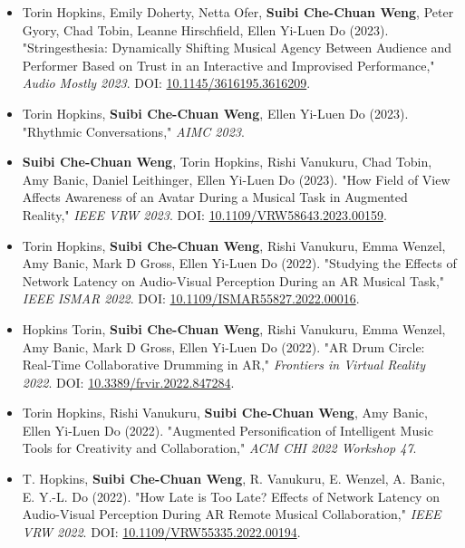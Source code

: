 \begin{itemize}
    \item Torin Hopkins, Emily Doherty, Netta Ofer, \textbf{Suibi Che-Chuan Weng}, Peter Gyory, Chad Tobin, Leanne Hirschfield, Ellen Yi-Luen Do (2023). "Stringesthesia: Dynamically Shifting Musical Agency Between Audience and Performer Based on Trust in an Interactive and Improvised Performance," \textit{Audio Mostly 2023}.
DOI: \href{https://doi.org/10.1145/3616195.3616209}{10.1145/3616195.3616209}.
    
    \item Torin Hopkins, \textbf{Suibi Che-Chuan Weng}, Ellen Yi-Luen Do (2023). "Rhythmic Conversations," \textit{AIMC 2023}.
    
    \item \textbf{Suibi Che-Chuan Weng}, Torin Hopkins, Rishi Vanukuru, Chad Tobin, Amy Banic, Daniel Leithinger, Ellen Yi-Luen Do (2023). "How Field of View Affects Awareness of an Avatar During a Musical Task in Augmented Reality," \textit{IEEE VRW 2023}.
DOI: \href{https://doi.org/10.1109/VRW58643.2023.00159}{10.1109/VRW58643.2023.00159}.
    
    \item Torin Hopkins, \textbf{Suibi Che-Chuan Weng}, Rishi Vanukuru, Emma Wenzel, Amy Banic, Mark D Gross, Ellen Yi-Luen Do (2022). "Studying the Effects of Network Latency on Audio-Visual Perception During an AR Musical Task," \textit{IEEE ISMAR 2022}.
DOI: \href{https://doi.org/10.1109/ISMAR55827.2022.00016}{10.1109/ISMAR55827.2022.00016}.
    
    \item Hopkins Torin, \textbf{Suibi Che-Chuan Weng}, Rishi Vanukuru, Emma Wenzel, Amy Banic, Mark D Gross, Ellen Yi-Luen Do (2022). "AR Drum Circle: Real-Time Collaborative Drumming in AR," \textit{Frontiers in Virtual Reality 2022}.
DOI: \href{https://doi.org/10.3389/frvir.2022.847284}{10.3389/frvir.2022.847284}.
    
    \item Torin Hopkins, Rishi Vanukuru, \textbf{Suibi Che-Chuan Weng}, Amy Banic, Ellen Yi-Luen Do (2022). "Augmented Personification of Intelligent Music Tools for Creativity and Collaboration," \textit{ACM CHI 2022 Workshop 47}.
    
    \item T. Hopkins, \textbf{Suibi Che-Chuan Weng}, R. Vanukuru, E. Wenzel, A. Banic, E. Y.-L. Do (2022). "How Late is Too Late? Effects of Network Latency on Audio-Visual Perception During AR Remote Musical Collaboration," \textit{IEEE VRW 2022}.
DOI: \href{https://doi.org/10.1109/VRW55335.2022.00194}{10.1109/VRW55335.2022.00194}.
\end{itemize}
